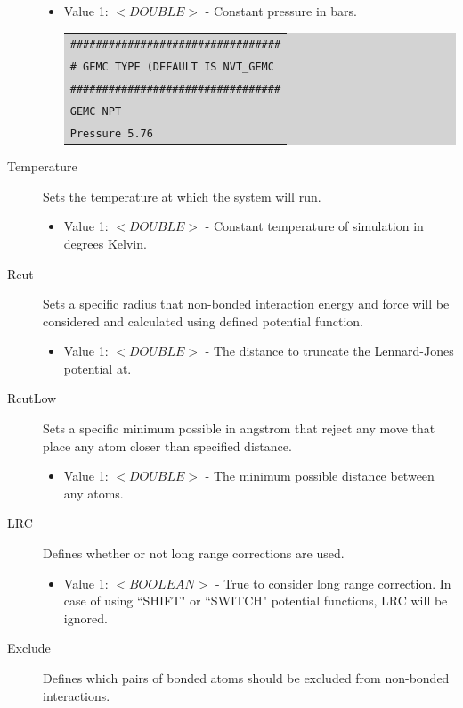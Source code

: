 \begin{description}
	\begin{itemize}
	\item Value 1: $<DOUBLE>$ - Constant pressure in bars.\\
	\colorbox{lightgray}{
	\begin{tabular}{l}
	\texttt{\#\#\#\#\#\#\#\#\#\#\#\#\#\#\#\#\#\#\#\#\#\#\#\#\#\#\#\#\#\#\#\#\#}\\
	\texttt{\# GEMC TYPE (DEFAULT IS NVT\_GEMC}\\
	\texttt{\#\#\#\#\#\#\#\#\#\#\#\#\#\#\#\#\#\#\#\#\#\#\#\#\#\#\#\#\#\#\#\#\#}\\
	\texttt{GEMC    NPT}\\
	\texttt{Pressure 5.76}\\
	\end{tabular}}
	\end{itemize}
\item [Temperature] Sets the temperature at which the system will run.
	\begin{itemize}
	\item Value 1: $<DOUBLE>$ - Constant temperature of simulation in degrees Kelvin.
	\end{itemize}
\item [Rcut] Sets a specific radius that non-bonded interaction energy and force will be considered and calculated using defined potential function.
	\begin{itemize}
	\item Value 1: $<DOUBLE>$ - The distance to truncate the Lennard-Jones potential at.
	\end{itemize}	
\item [RcutLow] Sets a specific minimum possible in angstrom that reject any move that place any atom closer than specified distance.
	\begin{itemize}
	\item Value 1: $<DOUBLE>$ - The minimum possible distance between any atoms.
	\end{itemize}
\item [LRC] Defines whether or not long range corrections are used.
	\begin{itemize}
	\item Value 1: $<BOOLEAN>$ - True to consider long range correction. In case of using ``SHIFT" or ``SWITCH" potential functions, LRC will be ignored.
	\end{itemize}
\item [Exclude] Defines which pairs of bonded atoms should be excluded from non-bonded interactions.
	\begin{itemize}

\end{itemize}
\end{description}
